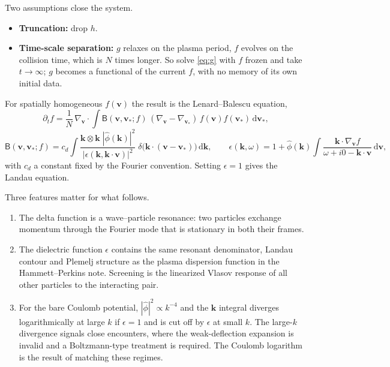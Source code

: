 \documentclass[11pt]{article}
\newcommand{\dd}{\mathrm{d}}
\newcommand{\bv}{\mathbf{v}}
\newcommand{\bk}{\mathbf{k}}
\newcommand{\diel}{\epsilon}
\theoremstyle{definition}
\begin{document}
Two assumptions close the system.
\begin{itemize}
  \item \textbf{Truncation:} drop $h$.
  \item \textbf{Time-scale separation:} $g$ relaxes on the plasma period,
    $f$ evolves on the collision time, which is $N$ times longer. So solve
    \eqref{eq:g} with $f$ frozen and take $t\to\infty$; $g$ becomes a
    functional of the current $f$, with no memory of its own initial data.
\end{itemize}
For spatially homogeneous $f(\bv)$ the result is the Lenard--Balescu
equation,
\begin{equation}
  \partial_t f = \frac{1}{N}\,\nabla_{\bv}\cdot\!\int
    \mathsf{B}(\bv,\bv_*;f)\,(\nabla_{\bv} - \nabla_{\bv_*})
    \,f(\bv) f(\bv_*)\,\dd\bv_* ,
  \label{eq:LB}
\end{equation}
\begin{equation}
  \mathsf{B}(\bv,\bv_*;f) = c_d\int
    \frac{\bk\otimes\bk\;|\hat\phi(\bk)|^2}
         {|\diel(\bk,\bk\cdot\bv)|^2}\;
    \delta\bigl(\bk\cdot(\bv - \bv_*)\bigr)\,\dd\bk ,
  \qquad
  \diel(\bk,\omega) = 1 + \hat\phi(\bk)\int
    \frac{\bk\cdot\nabla_{\bv} f}{\omega + i0 - \bk\cdot\bv}\,\dd\bv ,
\end{equation}
with $c_d$ a constant fixed by the Fourier convention. Setting $\diel = 1$
gives the Landau equation.

Three features matter for what follows.
\begin{enumerate}
  \item The delta function is a wave--particle resonance: two particles
    exchange momentum through the Fourier mode that is stationary in both
    their frames.
  \item The dielectric function $\diel$ contains the same resonant
    denominator, Landau contour and Plemelj structure as the plasma
    dispersion function in the Hammett--Perkins note. Screening is the
    linearized Vlasov response of all other particles to the interacting
    pair.
  \item For the bare Coulomb potential, $|\hat\phi|^2\propto k^{-4}$ and the
    $\bk$ integral diverges logarithmically at large $k$ if $\diel=1$ and is
    cut off by $\diel$ at small $k$. The large-$k$ divergence signals close
    encounters, where the weak-deflection expansion is invalid and a
    Boltzmann-type treatment is required. The Coulomb logarithm is the
    result of matching these regimes.
\end{enumerate}
\end{document}
